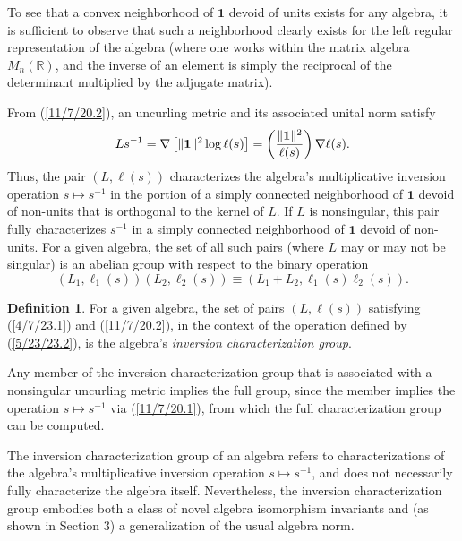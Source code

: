\documentclass{amsart}
\numberwithin{equation}{section}
\theoremstyle{definition}
\newtheorem{definition}[theorem]{Definition}
\numberwithin{theorem}{section}
\begin{document}
To see that a convex neighborhood of $\mathbf{1}$ devoid of units exists for any algebra, it is sufficient to observe that such a neighborhood clearly exists for the left regular representation of the algebra (where one works within the matrix algebra $ M_n(\mathbb{R})$, and the inverse of an element is simply the reciprocal of the determinant multiplied by the adjugate matrix).
  
    From (\ref{11/7/20.2}), an uncurling metric and its associated unital norm satisfy  \begin{equation}\label{11/7/20.1} Ls^{-1}  = \nabla\left[\|{\bf 1}\|^2\log  \ell(s)\right] =   \left(\frac{\|{\bf 1}\|^2}{ \ell(s)}\right)\nabla \ell(s).\end{equation} 
Thus, the pair $(L, \ell(s))$ characterizes the algebra's multiplicative inversion operation $s\mapsto s^{-1}$ in the portion of a simply connected neighborhood of $\mathbf{1}$ devoid of non-units that is orthogonal to the kernel of $L$.  If $L$ is nonsingular, this pair fully characterizes $s^{-1}$ in a simply connected neighborhood of $\mathbf{1}$ devoid of non-units.  For a given algebra, the set of all such pairs (where $L$ may or may not be singular) is an abelian group with respect to the binary operation 
\begin{equation}\label{5/23/23.2} (L_1, \ell_1(s))(L_2, \ell_2(s)) \equiv 
\left(L_1+L_2, \ell_1(s)  \ell_2(s)\right).\end{equation} 
\begin{definition} For a given algebra, the set of pairs $(L, \ell(s))$ satisfying (\ref{4/7/23.1}) and (\ref{11/7/20.2}), in the context of the operation defined by (\ref{5/23/23.2}), is the algebra's {\it inversion characterization group}. \end{definition}

Any member of the inversion characterization group that is associated with a nonsingular uncurling metric implies the full group, since the member implies the operation $s\mapsto s^{-1}$ via (\ref{11/7/20.1}), from which the full characterization group can be computed.

The inversion characterization group of an algebra refers to characterizations of the algebra's multiplicative inversion operation $s\mapsto s^{-1}$, and does not necessarily fully characterize the algebra itself.  
Nevertheless,  the inversion characterization group embodies both a class of  novel algebra isomorphism invariants and (as shown in Section 3) a generalization of the usual algebra norm.  
\end{document}
